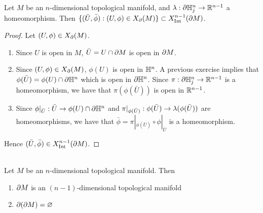 \documentclass{book}
\begin{document}
\begin{ex}
	Let $M$ be an $n$-dimensional topological manifold,  and $\lambda: \partial \mathbb{H}^n_j \rightarrow \mathbb{R}^{n-1}$ a homeomorphism. Then $\{(\bar{U}, \bar{\phi}): (U, \phi) \in X_{\partial}(M)\} \subset X^{n-1}_{\operatorname{Int}}(\partial M)$.
\end{ex}

\begin{proof}
	Let $(U, \phi) \in X_{\partial}(M)$.
	\begin{enumerate}
		\item Since $U$ is open in $M$, $\bar{U} = U \cap \partial M$ is open in $\partial M$. 
		\item Since $(U, \phi) \in X_{\partial}(M)$, $\phi(U)$ is open in $\mathbb{H}^n$. A previous exercise implies that $\phi(\bar{U}) = \phi(U) \cap \partial \mathbb{H}^n$ which is open in $\partial \mathbb{H}^n$. Since $\pi: \partial \mathbb{H}^n_j \rightarrow \mathbb{R}^{n-1}$ is a homeomorphism, we have that $\pi(\phi(\bar{U}))$ is open in $\mathbb{R}^{n-1}$. 
		\item Since $\phi|_{\bar{U}}: \bar{U} \rightarrow \phi(U) \cap \partial \mathbb{H}^n$ and $\pi|_{\phi(\bar{U})} : \phi(\bar{U}) \rightarrow \lambda(\phi(\bar{U})) $ are homeomorphisms, we have that $\bar{\phi} = \pi|_{\phi(\bar{U})} \circ \phi|_{\bar{U}}$ is a homeomorphism.
	\end{enumerate}
	Hence $(\bar{U}, \bar{\phi}) \in  X^{n-1}_{\operatorname{Int}}(\partial M)$.
\end{proof}

\begin{ex}  \\
	Let $M$ be an $n$-dimensional topological manifold. Then 
	\begin{enumerate}
		\item $\partial M$ is an $(n-1)$-dimensional topological manifold
		\item $\partial (\partial M) = \varnothing$
	\end{enumerate}
\end{ex}
\end{document}
